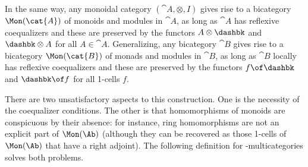 In the same way, any monoidal category $(\cat{A}, \otimes, I)$ gives rise
to a bicategory $\Mon(\cat{A})$ of monoids and modules in $\cat{A}$, as
long as $\cat{A}$ has reflexive coequalizers and these are preserved by the
functors $A \otimes \dashbk$ and $\dashbk \otimes A$ for all $A \in
\cat{A}$.  Generalizing, any bicategory $\cat{B}$ gives rise to a
bicategory $\Mon(\cat{B})$ of monads and modules in $\cat{B}$, as long as
$\cat{B}$ locally has reflexive coequalizers and these are preserved by the
functors $f\of\dashbk$ and $\dashbk\of f$ for all 1-cells $f$.

There are two unsatisfactory aspects to this construction.  One is the
necessity of the coequalizer conditions.  The other is that homomorphisms
of monoids are conspicuous by their absence: for instance, ring
homomorphisms are not an explicit part of $\Mon(\Ab)$ (although they can be
recovered as those 1-cells of $\Mon(\Ab)$ that have a right adjoint).  The
following definition for \fc-multicategories solves both problems.


